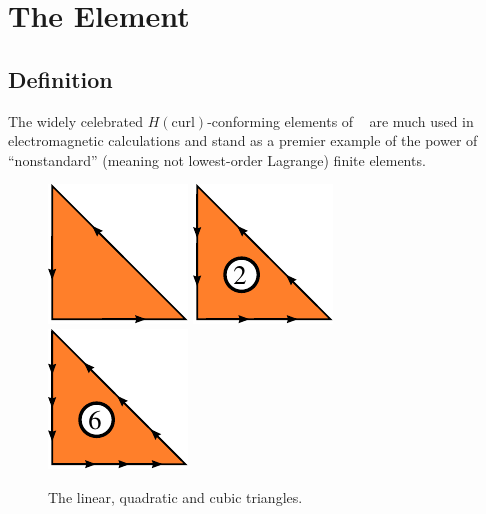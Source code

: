 
\newpage

\section{The \nedelec{} Element}

\subsection{Definition}

The widely celebrated \( H(\mathrm{curl}) \)-conforming elements of
\nedelec{}~\cite{Nedelec1980,Nedelec1986} are much used in electromagnetic
calculations and stand as a premier example of the power of
``nonstandard'' (meaning not lowest-order Lagrange) finite elements.

\begin{figure}[h]
  \begin{center}
    \includegraphics[width=\smallfig]{chapters/kirby-6/pdf/NED1.pdf}
    \includegraphics[width=\smallfig]{chapters/kirby-6/pdf/NED2.pdf}
    \includegraphics[width=\smallfig]{chapters/kirby-6/pdf/NED3.pdf}
    \caption{The linear, quadratic and cubic \nedelec{} triangles.}
  \end{center}
\end{figure}

